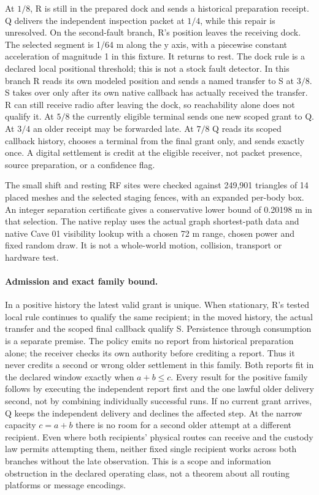 \documentclass{article}
\begin{document}
At \(1/8\), R is still in the prepared dock and sends a historical
preparation receipt. Q delivers the independent inspection packet
at \(1/4\), while this repair is unresolved.
On the second-fault branch, R's position leaves the receiving
dock. The selected segment is 1/64 m along the y axis, with a
piecewise constant acceleration of magnitude 1 in this fixture.
It returns to rest. The dock rule is a declared local positional
threshold; this is not a stock fault detector. In this branch
R reads its own modeled position and sends a named transfer to
S at \(3/8\). S takes over only after its own native callback has
actually received the transfer. R can still receive radio after
leaving the dock, so reachability alone does not qualify it.
At \(5/8\) the currently eligible terminal sends one new
scoped grant to Q. At \(3/4\) an older receipt may be forwarded
late. At \(7/8\) Q reads its scoped callback history, chooses a
terminal from the final grant only, and sends exactly once.
A digital settlement is credit at the eligible receiver,
not packet presence, source preparation, or a confidence flag.

The small shift and resting RF sites were checked against 249,901
triangles of 14 placed meshes and the selected staging fences,
with an expanded per-body box. An integer separation certificate
gives a conservative lower bound of 0.20198 m in that
selection. The native replay uses the actual graph shortest-path
data and native Cave 01 visibility lookup with a chosen 72 m
range, chosen power and fixed random draw. It is not a
whole-world motion, collision, transport or hardware test.

\paragraph{Admission and exact family bound.}
In a positive history the latest valid grant is unique. When
stationary, R's tested local rule continues to qualify the same
recipient; in the moved history, the actual transfer and the
scoped final callback qualify S. Persistence through
consumption is a separate premise. The policy emits no report
from historical preparation alone; the receiver checks
its own authority before crediting a report. Thus it never
credits a second or wrong older settlement in this family.
Both reports fit in the declared window exactly when
\(a+b\le c\). Every result for the positive family follows by
executing the independent report first and the one lawful older
delivery second, not by combining individually successful runs.
If no current grant arrives, Q keeps the independent delivery
and declines the affected step. At the narrow capacity
\(c=a+b\) there is no room for a second older attempt at a
different recipient. Even where both recipients' physical
routes can receive and the custody law permits attempting them,
neither fixed single recipient works across both branches
without the late observation. This is a scope and information
obstruction in the declared operating class, not a theorem
about all routing platforms or message encodings.
\end{document}
